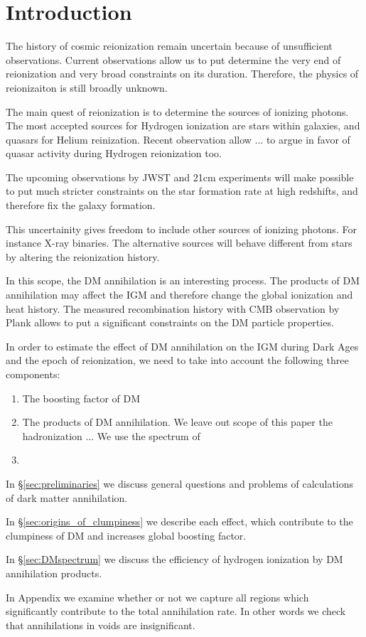 \section{Introduction}

The history of cosmic reionization remain uncertain because of unsufficient observations. Current observations allow us to put determine the very end of reionization and very broad constraints on its duration. Therefore, the physics of reionizaiton is still broadly unknown.

The main quest of reionization is to determine the sources of ionizing photons. The most accepted sources for Hydrogen ionization are stars within galaxies, and quasars for Helium reinization. Recent observation allow ... to argue in favor of quasar activity during Hydrogen reionization too.

The upcoming observations by JWST and 21cm experiments will make possible to put much stricter constraints on the star formation rate at high redshifts, and therefore fix the galaxy formation.

This uncertainity gives freedom to include other sources of ionizing photons. For instance X-ray binaries. The alternative sources will behave different from stars by altering the reionization history. 

In this scope, the DM annihilation is an interesting process. The products of DM annihilation may affect the IGM and therefore change the global ionization and heat history. The measured recombination history with CMB observation by Plank allows \cite{2015arXiv150603811S} to put a significant constraints on the DM particle properties.

In order to estimate the effect of DM annihilation on the IGM during Dark Ages and the epoch of reionization, we need to take into account the following three components:
\begin{enumerate}
\item The boosting factor of DM  
\item The products of DM annihilation. We leave out scope of this paper the hadronization ... We use the spectrum of 
\item
\end{enumerate}
In \S\ref{sec:preliminaries} we discuss general questions and problems of calculations of dark matter annihilation.

In \S\ref{sec:origins_of_clumpiness} we describe each effect, which contribute to the clumpiness of DM and increases global boosting factor.

In \S\ref{sec:DMspectrum} we discuss the efficiency of hydrogen ionization by DM annihilation products.

In Appendix we examine whether or not we capture all regions which significantly contribute to the total annihilation rate. In other words we check that annihilations in voids are insignificant.
